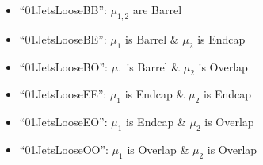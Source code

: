 \begin{itemize}
\begin{itemize}
\begin{itemize}
          \item ``01JetsLooseBB'': $\mu_{1,2}$ are Barrel
          \item ``01JetsLooseBE'': $\mu_{1}$ is Barrel \& $\mu_2$ is Endcap
          \item ``01JetsLooseBO'': $\mu_{1}$ is Barrel \& $\mu_2$ is Overlap
          \item ``01JetsLooseEE'': $\mu_{1}$ is Endcap \& $\mu_2$ is Endcap
          \item ``01JetsLooseEO'': $\mu_{1}$ is Endcap \& $\mu_2$ is Overlap
          \item ``01JetsLooseOO'': $\mu_{1}$ is Overlap \& $\mu_2$ is Overlap
        \end{itemize}
    \end{itemize}
\end{itemize}

